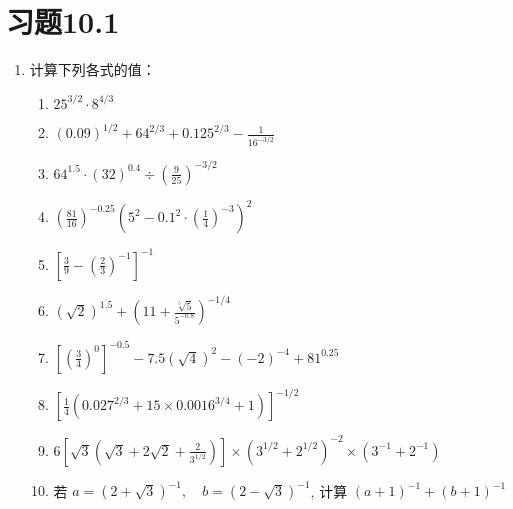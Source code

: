 \section*{习题10.1}
\begin{enumerate}
  \item 计算下列各式的值：
\begin{enumerate}
\item  $25^{3 / 2} \cdot 8^{4 / 3}$ 
\item $(0.09)^{1 / 2}+64^{2 / 3}+0.125^{2 / 3}-\frac{1}{16^{-3 / 2}}$
\item  $64^{1.5} \cdot(32)^{0.4} \div\left(\frac{9}{25}\right)^{-3 / 2}$
\item  $\left(\frac{81}{16}\right)^{-0.25}\left(5^{2}-0.1^{2} \cdot\left(\frac{1}{4}\right)^{-3}\right)^{2}$
\item  $\left[\frac{3}{9}-\left(\frac{2}{3}\right)^{-1}\right]^{-1}$
\item $(\sqrt{2})^{1.5}+\left(11+\frac{\sqrt[5]{5}}{5^{-0.8}}\right)^{-1 / 4}$
\item $\left[\left(\frac{3}{4}\right)^{0}\right]^{-0.5}-7.5(\sqrt{4})^{2}-(-2)^{-4}+81^{0.25}$
\item  $\left[\frac{1}{4}\left(0.027^{2 / 3}+15 \times 0.0016^{3 / 4}+1\right)\right]^{-1 / 2}$
\item  $6\left[\sqrt{3}\left(\sqrt{3}+2 \sqrt{2}+\frac{2}{3^{1 / 2}}\right)\right] \times\left(3^{1 / 2}+2^{1 / 2}\right)^{-2} \times\left(3^{-1}+2^{-1}\right)$
\item 若 $a=(2+\sqrt{3})^{-1},\quad  b=(2-\sqrt{3})^{-1}$, 计算 $(a+1)^{-1}+(b+1)^{-1}$
\end{enumerate}


\end{enumerate}
